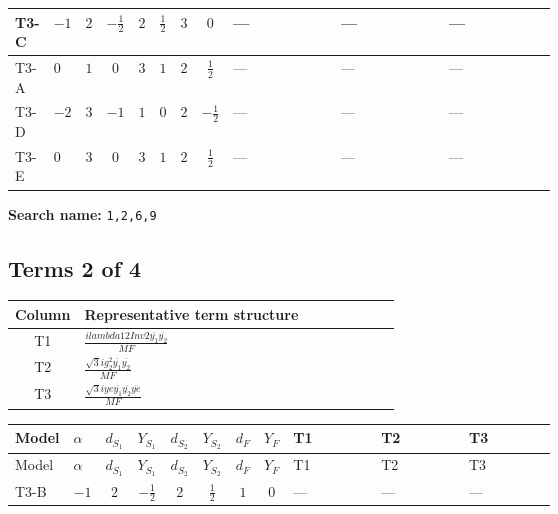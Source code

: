 \documentclass[8pt]{article}
\begin{document}
\begin{landscape}
\begin{longtable}{@{}llcccccc >{\raggedright\arraybackslash}p{0.21\linewidth} >{\raggedright\arraybackslash}p{0.21\linewidth} >{\raggedright\arraybackslash}p{0.21\linewidth}@{}}
\midrule
T3-C & $-1$ & $2$ & $-\frac{1}{2}$ & $2$ & $\frac{1}{2}$ & $3$ & $0$ & --- & --- & --- \\
\midrule
T3-A & $0$ & $1$ & $0$ & $3$ & $1$ & $2$ & $\frac{1}{2}$ & --- & --- & --- \\
\midrule
T3-D & $-2$ & $3$ & $-1$ & $1$ & $0$ & $2$ & $-\frac{1}{2}$ & --- & --- & --- \\
\midrule
T3-E & $0$ & $3$ & $0$ & $3$ & $1$ & $2$ & $\frac{1}{2}$ & --- & --- & --- \\
\midrule
\bottomrule
\end{longtable}
\clearpage
\noindent\textbf{Search name: }\texttt{1,2,6,9}\par\smallskip
\subsection*{Terms 2 of 4}
\begin{center}
\begin{tabular}{@{}c >{\raggedright\arraybackslash}p{0.82\linewidth}@{}}
\toprule
Column & Representative term structure \\
\midrule
T1 & \(\displaystyle \frac{i lambda12Inv2 \overline{y_{1}} \overline{y_{2}}}{MF}\) \\
\midrule
T2 & \(\displaystyle \frac{\sqrt{3} i g_{2}^{2} \overline{y_{1}} \overline{y_{2}}}{MF}\) \\
\midrule
T3 & \(\displaystyle \frac{\sqrt{3} i ye \overline{y_{1}} \overline{y_{2}} \overline{ye}}{MF}\) \\
\midrule
\bottomrule
\end{tabular}
\end{center}
\smallskip
\tiny
\begin{longtable}{@{}llcccccc >{\raggedright\arraybackslash}p{0.21\linewidth} >{\raggedright\arraybackslash}p{0.21\linewidth} >{\raggedright\arraybackslash}p{0.21\linewidth}@{}}
\toprule
Model & $\alpha$ & $d_{S_1}$ & $Y_{S_1}$ & $d_{S_2}$ & $Y_{S_2}$ & $d_F$ & $Y_F$ & T1 & T2 & T3 \\
\midrule
\endfirsthead
\toprule
Model & $\alpha$ & $d_{S_1}$ & $Y_{S_1}$ & $d_{S_2}$ & $Y_{S_2}$ & $d_F$ & $Y_F$ & T1 & T2 & T3 \\
\midrule
\endhead
T3-B & $-1$ & $2$ & $-\frac{1}{2}$ & $2$ & $\frac{1}{2}$ & $1$ & $0$ & --- & --- & --- \\
\midrule

\end{longtable}
\end{landscape}
\end{document}
